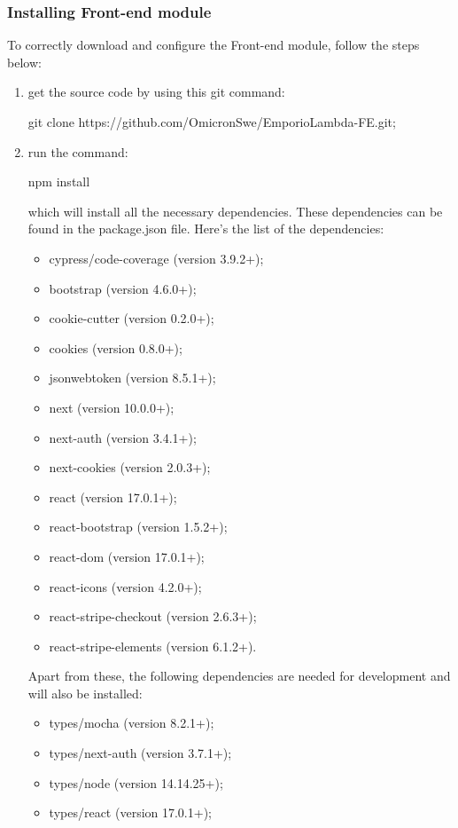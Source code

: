 \subsubsection{Installing Front-end module}
To correctly download and configure the Front-end module, follow the steps below:
\begin{enumerate}
\item get the source code by using this git command:\begin{center}git clone https://github.com/OmicronSwe/EmporioLambda-FE.git;\end{center}
\item run the command:\begin{center}npm install\end{center}which will install all the necessary dependencies. These dependencies can be found in the package.json file.\newline{} Here's the list of the dependencies:
\begin{itemize}
\item cypress/code-coverage (version 3.9.2+);
\item bootstrap (version 4.6.0+);
\item cookie-cutter (version 0.2.0+);
\item cookies (version 0.8.0+);
\item jsonwebtoken (version 8.5.1+);
\item next (version 10.0.0+);
\item next-auth (version 3.4.1+);
\item next-cookies (version 2.0.3+);
\item react (version 17.0.1+);
\item react-bootstrap (version 1.5.2+);
\item react-dom (version 17.0.1+);
\item react-icons (version 4.2.0+);
\item react-stripe-checkout (version 2.6.3+);
\item react-stripe-elements (version 6.1.2+).
\end{itemize}
Apart from these, the following dependencies are needed for development and will also be installed:
\begin{itemize}
\item types/mocha (version 8.2.1+);
\item types/next-auth (version 3.7.1+);
\item types/node (version 14.14.25+);
\item types/react (version 17.0.1+);

\end{itemize}
\end{enumerate}
